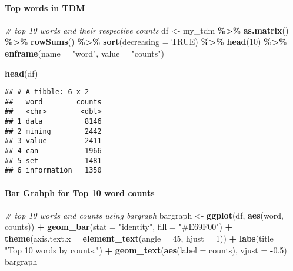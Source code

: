\documentclass[
]{article}
\newenvironment{Shaded}{\begin{snugshade}}{\end{snugshade}}
\newcommand{\AttributeTok}[1]{\textcolor[rgb]{0.13,0.29,0.53}{#1}}
\newcommand{\CommentTok}[1]{\textcolor[rgb]{0.56,0.35,0.01}{\textit{#1}}}
\newcommand{\ConstantTok}[1]{\textcolor[rgb]{0.56,0.35,0.01}{#1}}
\newcommand{\DecValTok}[1]{\textcolor[rgb]{0.00,0.00,0.81}{#1}}
\newcommand{\FloatTok}[1]{\textcolor[rgb]{0.00,0.00,0.81}{#1}}
\newcommand{\FunctionTok}[1]{\textcolor[rgb]{0.13,0.29,0.53}{\textbf{#1}}}
\newcommand{\NormalTok}[1]{#1}
\newcommand{\OtherTok}[1]{\textcolor[rgb]{0.56,0.35,0.01}{#1}}
\newcommand{\SpecialCharTok}[1]{\textcolor[rgb]{0.81,0.36,0.00}{\textbf{#1}}}
\newcommand{\StringTok}[1]{\textcolor[rgb]{0.31,0.60,0.02}{#1}}
\begin{document}
\hypertarget{top-words-in-tdm}{%
\paragraph{Top words in TDM}\label{top-words-in-tdm}}

\begin{Shaded}
\begin{Highlighting}[]
\CommentTok{\# top 10 words and their respective counts }
\NormalTok{df }\OtherTok{\textless{}{-}}
\NormalTok{    my\_tdm }\SpecialCharTok{\%\textgreater{}\%}
    \FunctionTok{as.matrix}\NormalTok{() }\SpecialCharTok{\%\textgreater{}\%}
    \FunctionTok{rowSums}\NormalTok{() }\SpecialCharTok{\%\textgreater{}\%}
    \FunctionTok{sort}\NormalTok{(}\AttributeTok{decreasing =} \ConstantTok{TRUE}\NormalTok{) }\SpecialCharTok{\%\textgreater{}\%}
    \FunctionTok{head}\NormalTok{(}\DecValTok{10}\NormalTok{) }\SpecialCharTok{\%\textgreater{}\%}
    \FunctionTok{enframe}\NormalTok{(}\AttributeTok{name =} \StringTok{"word"}\NormalTok{, }\AttributeTok{value =} \StringTok{"counts"}\NormalTok{)}

\FunctionTok{head}\NormalTok{(df)}
\end{Highlighting}
\end{Shaded}

\begin{verbatim}
## # A tibble: 6 x 2
##   word        counts
##   <chr>        <dbl>
## 1 data          8146
## 2 mining        2442
## 3 value         2411
## 4 can           1966
## 5 set           1481
## 6 information   1350
\end{verbatim}

\hypertarget{bar-grahph-for-top-10-word-counts}{%
\paragraph{Bar Grahph for Top 10 word
counts}\label{bar-grahph-for-top-10-word-counts}}

\begin{Shaded}
\begin{Highlighting}[]
\CommentTok{\# top 10 words and counts using bargraph}
\NormalTok{bargraph }\OtherTok{\textless{}{-}} \FunctionTok{ggplot}\NormalTok{(df, }\FunctionTok{aes}\NormalTok{(word, counts)) }\SpecialCharTok{+}
  \FunctionTok{geom\_bar}\NormalTok{(}\AttributeTok{stat =} \StringTok{"identity"}\NormalTok{, }\AttributeTok{fill =} \StringTok{"\#E69F00"}\NormalTok{) }\SpecialCharTok{+}
  \FunctionTok{theme}\NormalTok{(}\AttributeTok{axis.text.x =} \FunctionTok{element\_text}\NormalTok{(}\AttributeTok{angle =} \DecValTok{45}\NormalTok{, }\AttributeTok{hjust =} \DecValTok{1}\NormalTok{)) }\SpecialCharTok{+}
  \FunctionTok{labs}\NormalTok{(}\AttributeTok{title =} \StringTok{"Top 10 words by counts."}\NormalTok{) }\SpecialCharTok{+}
  \FunctionTok{geom\_text}\NormalTok{(}\FunctionTok{aes}\NormalTok{(}\AttributeTok{label =}\NormalTok{ counts), }\AttributeTok{vjust =} \SpecialCharTok{{-}}\FloatTok{0.5}\NormalTok{)}
\NormalTok{bargraph}
\end{Highlighting}
\end{Shaded}
\end{document}
